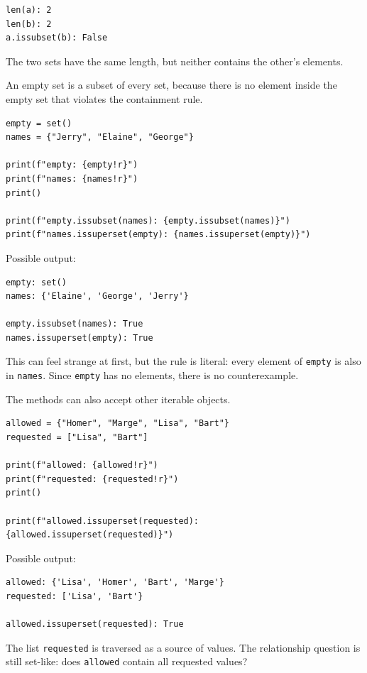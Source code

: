\begin{verbatim}
len(a): 2
len(b): 2
a.issubset(b): False
\end{verbatim}

The two sets have the same length, but neither contains the other's elements.

An empty set is a subset of every set, because there is no element inside the empty set that violates the containment rule.

\begin{verbatim}
empty = set()
names = {"Jerry", "Elaine", "George"}

print(f"empty: {empty!r}")
print(f"names: {names!r}")
print()

print(f"empty.issubset(names): {empty.issubset(names)}")
print(f"names.issuperset(empty): {names.issuperset(empty)}")
\end{verbatim}

Possible output:

\begin{verbatim}
empty: set()
names: {'Elaine', 'George', 'Jerry'}

empty.issubset(names): True
names.issuperset(empty): True
\end{verbatim}

This can feel strange at first, but the rule is literal: every element of \texttt{empty} is also in \texttt{names}. Since \texttt{empty} has no elements, there is no counterexample.

The methods can also accept other iterable objects.

\begin{verbatim}
allowed = {"Homer", "Marge", "Lisa", "Bart"}
requested = ["Lisa", "Bart"]

print(f"allowed: {allowed!r}")
print(f"requested: {requested!r}")
print()

print(f"allowed.issuperset(requested): {allowed.issuperset(requested)}")
\end{verbatim}

Possible output:

\begin{verbatim}
allowed: {'Lisa', 'Homer', 'Bart', 'Marge'}
requested: ['Lisa', 'Bart'}

allowed.issuperset(requested): True
\end{verbatim}

The list \texttt{requested} is traversed as a source of values. The relationship question is still set-like: does \texttt{allowed} contain all requested values?

